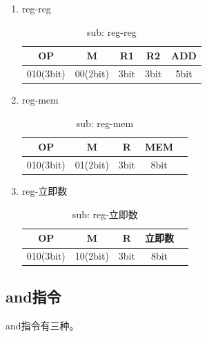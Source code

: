 \documentclass[UTF8]{ctexrep}
\begin{document}
\begin{enumerate}
\item reg-reg
\begin{table}[H]
\centering
\begin{tabular}{|c|c|c|c|c|}
\hline
OP        & M        & R1   & R2   & ADD  \\ \hline
010(3bit) & 00(2bit) & 3bit & 3bit & 5bit \\ \hline
\end{tabular}
\caption{sub: reg-reg}
\label{tab:10}
\end{table}

\item reg-mem
\begin{table}[H]
\centering
\begin{tabular}{|c|c|c|c|c|}
\hline
OP        & M        & R    & MEM  \\ \hline
010(3bit) & 01(2bit) & 3bit & 8bit \\ \hline
\end{tabular}
\caption{sub: reg-mem}
\label{tab:11}
\end{table}

\item reg-立即数
\begin{table}[H]
\centering
\begin{tabular}{|c|c|c|c|c|}
\hline
OP        & M        & R    & 立即数  \\ \hline
010(3bit) & 10(2bit) & 3bit & 8bit \\ \hline
\end{tabular}
\caption{sub: reg-立即数}
\label{tab:12}
\end{table}

\end{enumerate}

\subsection{and指令}
and指令有三种。
\end{document}
